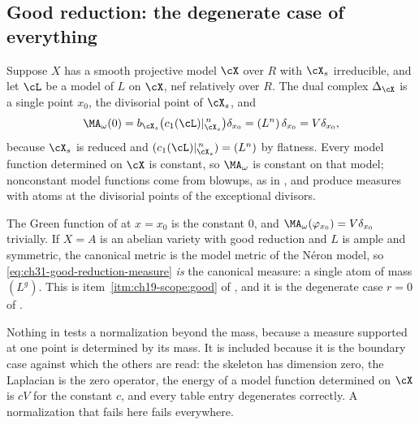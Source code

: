 \subsection{Good reduction: the degenerate case of everything}
\label{sec:ch31-good-reduction}

\begin{example}
\label{ex:ch31-good-reduction}
Suppose \(X\) has a smooth projective model \(\cX\) over \(R\) with
\(\cX_s\) irreducible, and let \(\cL\) be a model of \(L\) on \(\cX\), nef
relatively over \(R\).  The dual complex \(\Delta_{\cX}\) is a single point
\(x_0\), the divisorial point of \(\cX_s\), and
\begin{equation}
\label{eq:ch31-good-reduction-measure}
 \MA_\omega(0)=b_{\cX_s}\bigl(c_1(\cL)|_{\cX_s}^{\,n}\bigr)\delta_{x_0}
 =(L^n)\,\delta_{x_0}=V\delta_{x_0},
\end{equation}
because \(\cX_s\) is reduced and \((c_1(\cL)|_{\cX_s}^{\,n})=(L^n)\) by
flatness.  Every model function determined on \(\cX\) is constant, so
\(\MA_\omega\) is constant on that model; nonconstant model functions come
from blowups, as in , and produce measures with
atoms at the divisorial points of the exceptional divisors.

The Green function of  at \(x=x_0\) is the constant
\(0\), and \(\MA_\omega(\varphi_{x_0})=V\delta_{x_0}\) trivially.  If
\(X=A\) is an abelian variety with good reduction and \(L\) is ample and
symmetric, the canonical metric is the model metric of the N\'eron model, so
\eqref{eq:ch31-good-reduction-measure} \emph{is} the canonical measure:
a single atom of mass \((L^g)\).  This is
item~\cref{itm:ch19-scope:good} of , and it is the
degenerate case \(r=0\) of .
\end{example}

\begin{remark}
\label{rem:ch31-good-reduction-scope}
Nothing in  tests a normalization beyond the
mass, because a measure supported at one point is determined by its mass.
It is included because it is the boundary case against which the others are
read: the skeleton has dimension zero, the Laplacian is the zero operator,
the energy of a model function determined on \(\cX\) is \(cV\) for the
constant \(c\), and every table entry degenerates correctly.  A
normalization that fails here fails everywhere.
\end{remark}

